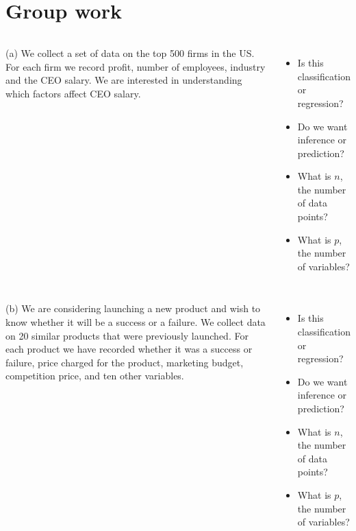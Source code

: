 \documentclass[aspectratio=169,xcolor,dvipsnames]{beamer}
\newcommand{\InstructorNotes}[1]{{\color{orange}#1}}
\renewcommand{\InstructorNotes}[1]{}
\newcommand{\bvfill}{\vskip0pt plus 1filll}
\begin{document}
\section{Group work}
{
\begin{frame}
\begin{columns}
(a) We collect a set of data on the top 500 firms in the US. For each
firm we record profit, number of employees, industry and the
CEO salary. We are interested in understanding which factors
aﬀect CEO salary.

\begin{itemize}
	\item Is this classification or regression? 
	\InstructorNotes{regression}
	\item Do we want inference or prediction?
	\InstructorNotes{Inference}
	\item What is $n$, the number of data points?
	\InstructorNotes{500}
	\item What is $p$, the number of variables?
	\InstructorNotes{3}
\end{itemize}
\end{columns}

	\InstructorNotes{From Ex 2.4.2}
\end{frame}

\begin{frame}
\begin{columns}
(b) We are considering launching a new product and wish to know
whether it will be a success or a failure. We collect data on 20
similar products that were previously launched. For each product we have recorded whether it was a success or failure, price
charged for the product, marketing budget, competition price,
and ten other variables.
\begin{itemize}
	\item Is this classification or regression?
	\InstructorNotes{classification}
	\item Do we want inference or prediction?
	\InstructorNotes{Prediction}
	\item What is $n$, the number of data points?
	\InstructorNotes{20}
	\item What is $p$, the number of variables?
	\InstructorNotes{13}
\end{itemize}
\end{columns}

\end{frame}
}
\end{document}
